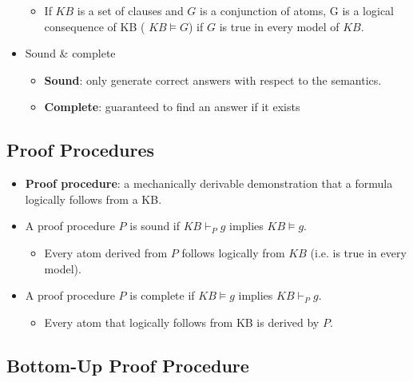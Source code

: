 \documentclass{article}
\begin{document}
\begin{itemize}
\begin{itemize}
            \item If $KB$ is a set of clauses and $G$ is a conjunction of atoms, G is a logical consequence of KB ( $KB \vDash G$) if $G$ is true in every model of $KB$.
        \end{itemize}
    \item Sound \& complete
        \begin{itemize}
            \item \textbf{Sound}: only generate correct answers with respect to the semantics.
            \item \textbf{Complete}: guaranteed to find an answer if it exists
        \end{itemize}
\end{itemize}

\subsection{Proof Procedures}

\begin{itemize}
    \item \textbf{Proof procedure}: a mechanically derivable demonstration that a formula logically follows from a KB.
    \item A proof procedure $P$ is sound if $KB \vdash_P g$ implies $KB \vDash g$.
        \begin{itemize}
            \item Every atom derived from $P$ follows logically from $KB$ (i.e. is true in every model).
        \end{itemize}
    \item A proof procedure $P$ is complete if $KB \vDash g$ implies $KB \vdash_P g$.
        \begin{itemize}
            \item Every atom that logically follows from KB is derived by $P$.
        \end{itemize}
\end{itemize}

\subsection{Bottom-Up Proof Procedure}
\end{document}
